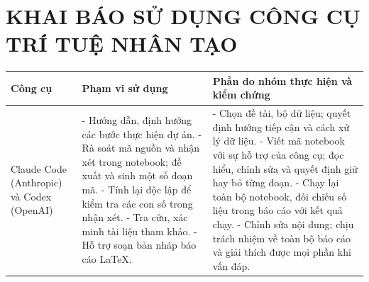 \appendix
{}
\chapter{KHAI BÁO SỬ DỤNG CÔNG CỤ TRÍ TUỆ NHÂN TẠO}
\label{app:ai}

\begingroup
{}
\noindent
\begin{tabularx}{\textwidth}{|>{\raggedright\arraybackslash}p{2.8cm}|>{\raggedright\arraybackslash}X|>{\raggedright\arraybackslash}X|}
\hline
\textbf{Công cụ} & \textbf{Phạm vi sử dụng} & \textbf{Phần do nhóm thực hiện và kiểm chứng} \\ \hline
Claude Code (Anthropic) và Codex (OpenAI) &
- Hướng dẫn, định hướng các bước thực hiện dự án.\newline
- Rà soát mã nguồn và nhận xét trong notebook; đề xuất và sinh một số đoạn mã.\newline
- Tính lại độc lập để kiểm tra các con số trong nhận xét.\newline
- Tra cứu, xác minh tài liệu tham khảo.\newline
- Hỗ trợ soạn bản nháp báo cáo LaTeX. &
- Chọn đề tài, bộ dữ liệu; quyết định hướng tiếp cận và cách xử lý dữ liệu.\newline
- Viết mã notebook với sự hỗ trợ của công cụ; đọc hiểu, chỉnh sửa và quyết định giữ hay bỏ từng đoạn.\newline
- Chạy lại toàn bộ notebook, đối chiếu số liệu trong báo cáo với kết quả chạy.\newline
- Chỉnh sửa nội dung; chịu trách nhiệm về toàn bộ báo cáo và giải thích được mọi phần khi vấn đáp. \\ \hline
\end{tabularx}
\endgroup
